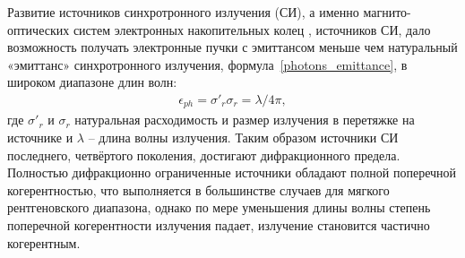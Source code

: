 

Развитие источников синхротронного излучения (СИ), а именно магнито-оптических систем электронных накопительных колец \cite{bartolini_challenges_2021}, \cite{hettel_challenges_2014} источников СИ, дало возможность получать электронные пучки с эмиттансом меньше чем натуральный «эмиттанс» синхротронного излучения, формула~\ref{photons_emittance}, в широком диапазоне длин волн:
\begin{align}
	\epsilon_{ph} = \sigma'_{r}\sigma_{r} = \lambda/4\pi,
	\label{eq:photons_emittance}
\end{align}
где $\sigma'_{r}$ и $\sigma_{r}$ натуральная расходимость и размер излучения в перетяжке на источнике и $\lambda$ -- длина волны излучения. Таким образом источники СИ последнего, четвёртого поколения, достигают дифракционного предела. Полностью дифракционно ограниченные источники обладают полной поперечной когерентностью, что выполняется в большинстве случаев для мягкого рентгеновского диапазона, однако по мере уменьшения длины волны степень поперечной когерентности излучения падает, излучение становится частично когерентным. 


